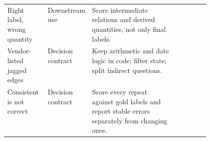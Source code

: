 \begin{table}[tbp]
\begin{tabularx}{\linewidth}{p{0.2\linewidth}p{0.12\linewidth}Xp{0.16\linewidth}}
Right label, wrong quantity & Downstream use & Score intermediate relations and derived quantities, not only final labels. & \citep{arxiv2609_24965} \\
Vendor-listed jagged edges & Decision contract & Keep arithmetic and date logic in code; filter state; split indirect questions. & \citep{typesafe2026jaggedness} \\
Consistent is not correct & Decision contract & Score every repeat against gold labels and report stable errors separately from changing ones. & \citep{arxiv2609_27678} \\
\bottomrule
\end{tabularx}
\end{table}
